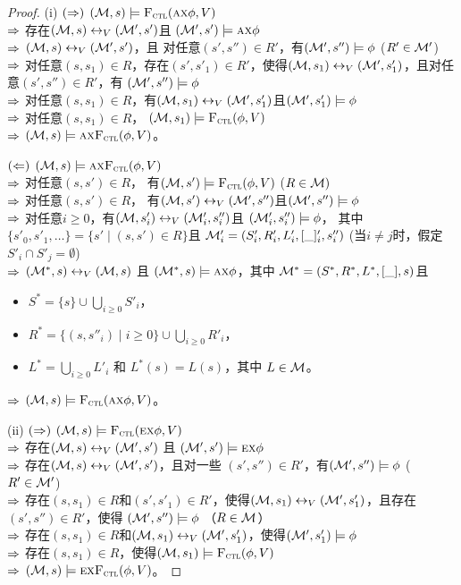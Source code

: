 \begin{proof}
	(i) $(\Rightarrow)$ $({\cal M},s)\models{\textsc{F}_{\textsc{ctl}}}(\textsc{a}\textsc{x}\phi,V)$\\
	$\Rightarrow$ 存在$({\cal M},s)\leftrightarrow_V({\cal M}',s')$且 $({\cal M}',s')\models \textsc{a}\textsc{x}\phi$\\
	$\Rightarrow$  $({\cal M},s)\leftrightarrow_V({\cal M}',s')$，且 对任意$(s',s'')\in R'$，有$({\cal M}',s'')\models \phi$ \hfill ($R'\in{\cal M}'$)\\
	$\Rightarrow$ 对任意$(s,s_1)\in R$，存在$(s',s'_1)\in R'$，使得$({\cal M},s_1)\leftrightarrow_V({\cal M}',s'_1)$，且对任意$(s',s'')\in R'$，有
	$({\cal M}',s'')\models \phi$\\
	$\Rightarrow$ 对任意$(s,s_1)\in R$，有$({\cal M},s_1)\leftrightarrow_V({\cal M}',s'_1)$且$({\cal M}',s'_1)\models\phi$\\
	$\Rightarrow$ 对任意$(s,s_1)\in R$， $({\cal M},s_1)\models{\textsc{F}_{\textsc{ctl}}}(\phi,V)$\\
	$\Rightarrow$ $({\cal M},s)\models\textsc{a}\textsc{x}{\textsc{F}_{\textsc{ctl}}}(\phi,V)$。
	
	$(\Leftarrow)$ $({\cal M},s)\models\textsc{a}\textsc{x}{\textsc{F}_{\textsc{ctl}}}(\phi,V)$\\
	$\Rightarrow$ 对任意$(s,s')\in R$， 有$({\cal M},s')\models{\textsc{F}_{\textsc{ctl}}}(\phi,V)$ \hfill ($R\in {\cal M})$\\
	$\Rightarrow$ 对任意$(s,s')\in R$， 有$({\cal M},s')\leftrightarrow_V({\cal M}',s'')$且$({\cal M}',s'')\models\phi$\\
	$\Rightarrow$ 对任意$i\ge 0$，有$({\cal M},s'_i)\leftrightarrow_V({\cal M}'_i,s''_i)$且 $({\cal M}'_i,s''_i)\models\phi$，
	其中 $\{s'_0,s'_1,\ldots\}=\{s'\mid (s,s')\in R\}$且 ${\cal M}'_i=(S'_i,R'_i,L'_i,[\_]'_i,s''_i)$ \hfill (当$i\neq j$时，假定$S'_i\cap S'_j=\emptyset$)\\
	$\Rightarrow$ $({\cal M}^*,s)\leftrightarrow_V({\cal M},s)$ 且 $({\cal M}^*,s)\models\textsc{a}\textsc{x}\phi$，其中
	${\cal M}^*=(S^*,R^*,L^*,[\_], s)$且
	\begin{itemize}
		\item $S^*=\{s\}\cup\bigcup_{i\ge 0}S'_i$，
		\item $R^*=\{(s,s''_i)\mid i\ge 0\}\cup \bigcup_{i\ge 0} R'_i$，
		\item $L^*=\bigcup_{i\ge 0}L'_i$ 和 $L^*(s)=L(s)$，其中 $L\in{\cal M}$。
	\end{itemize}
	$\Rightarrow$ $({\cal M},s)\models {\textsc{F}_{\textsc{ctl}}}(\textsc{a}\textsc{x}\phi,V)$。
	
	(ii) $(\Rightarrow)$ $({\cal M},s)\models{\textsc{F}_{\textsc{ctl}}}(\textsc{e}\textsc{x}\phi,V)$\\
	$\Rightarrow$ 存在$({\cal M},s)\leftrightarrow_V({\cal M}',s')$ 且 $({\cal M}',s')\models \textsc{e}\textsc{x}\phi$\\
	$\Rightarrow$ 存在$({\cal M},s)\leftrightarrow_V({\cal M}',s')$，且对一些 $(s',s'')\in R'$，有$({\cal M}',s'')\models \phi$ \hfill  ($R'\in{\cal M}'$)\\
	$\Rightarrow$ 存在$(s,s_1)\in R$和$(s',s'_1)\in R'$，使得$({\cal M},s_1)\leftrightarrow_V({\cal M}',s'_1)$，且存在$(s',s'')\in R'$，使得
	$({\cal M}',s'')\models \phi$ （$R\in {\cal M}$）\\
	$\Rightarrow$ 存在$(s,s_1)\in R$和$({\cal M},s_1)\leftrightarrow_V({\cal M}',s'_1)$，使得$({\cal M}',s'_1)\models\phi$\\
	$\Rightarrow$ 存在$(s,s_1)\in R$，使得$({\cal M},s_1)\models{\textsc{F}_{\textsc{ctl}}}(\phi,V)$\\
	$\Rightarrow$ $({\cal M},s)\models\textsc{e}\textsc{x}{\textsc{F}_{\textsc{ctl}}}(\phi,V)$。
	

\end{proof}
